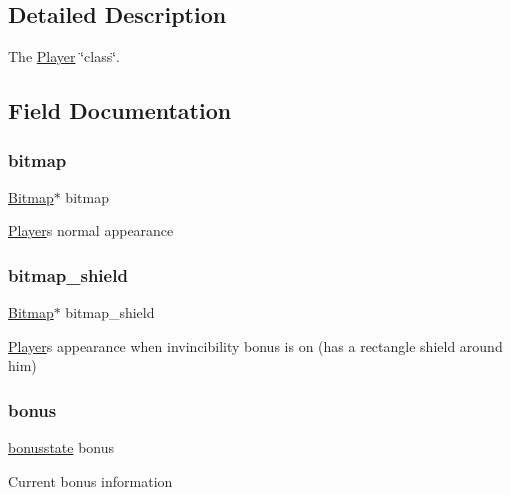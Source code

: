 \subsection{Detailed Description}
The \hyperlink{struct_player}{Player} \char`\"{}class\char`\"{}. 

\subsection{Field Documentation}
\hypertarget{struct_player_a00c870e2cedff0b231b1c8ad85019f66}{}\label{struct_player_a00c870e2cedff0b231b1c8ad85019f66} 
\subsubsection{\texorpdfstring{bitmap}{bitmap}}
{\footnotesize\ttfamily \hyperlink{struct_bitmap}{Bitmap}$\ast$ bitmap}

\hyperlink{struct_player}{Player}\textquotesingle{}s normal appearance \hypertarget{struct_player_adb5f5a8861d7950622a415e122e4e6d7}{}\label{struct_player_adb5f5a8861d7950622a415e122e4e6d7} 
\subsubsection{\texorpdfstring{bitmap\+\_\+shield}{bitmap\_shield}}
{\footnotesize\ttfamily \hyperlink{struct_bitmap}{Bitmap}$\ast$ bitmap\+\_\+shield}

\hyperlink{struct_player}{Player}\textquotesingle{}s appearance when invincibility bonus is on (has a rectangle shield around him) \hypertarget{struct_player_ad071f1edf847f7378f6161c02ba70640}{}\label{struct_player_ad071f1edf847f7378f6161c02ba70640} 
\subsubsection{\texorpdfstring{bonus}{bonus}}
{\footnotesize\ttfamily \hyperlink{group__player_ga3ab4abfc8d967315be3486178b91d2d9}{bonusstate} bonus}

Current bonus information \hypertarget{struct_player_a0b2f5a7e6b082f9f828b559d165ac60f}{}\label{struct_player_a0b2f5a7e6b082f9f828b559d165ac60f} 
